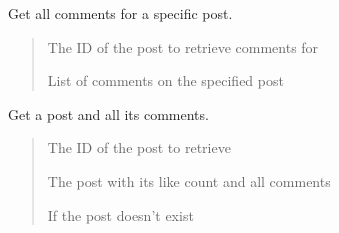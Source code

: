 \documentclass[letterpaper,10pt,openany,oneside,english]{sphinxmanual}
\begin{document}

\begin{savenotes}\begin{fulllineitems}
\label{\detokenize{modules/routers:storeapi.routers.post.get_comments_on_post}}
\pysigstartsignatures
{}
\pysigstopsignatures
\sphinxAtStartPar
Get all comments for a specific post.
\begin{quote}\begin{description}
\sphinxAtStartPar
{} \textendash{} The ID of the post to retrieve comments for

\sphinxAtStartPar
List of comments on the specified post

\end{description}\end{quote}

\end{fulllineitems}\end{savenotes}


\begin{savenotes}\begin{fulllineitems}
\label{\detokenize{modules/routers:storeapi.routers.post.get_post_with_comments}}
\pysigstartsignatures
{}
\pysigstopsignatures
\sphinxAtStartPar
Get a post and all its comments.
\begin{quote}\begin{description}
\sphinxAtStartPar
{} \textendash{} The ID of the post to retrieve

\sphinxAtStartPar
The post with its like count and all comments

\sphinxAtStartPar
{} \textendash{} If the post doesn’t exist

\end{description}\end{quote}

\end{fulllineitems}\end{savenotes}
\end{document}
